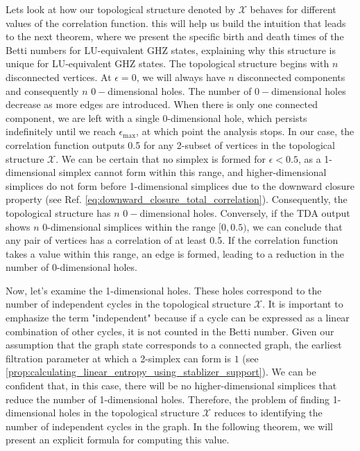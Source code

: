 \documentclass{article}
\begin{document}
 Lets look at how our topological structure denoted by $\mathcal{X} $ behaves for different values of the correlation function. this will help us build the intuition that leads to the next theorem, where we present the specific birth and death times of the Betti numbers for LU-equivalent GHZ states, explaining why this structure is unique for LU-equivalent GHZ states. The topological structure begins with $n$ disconnected vertices. At $\epsilon = 0$, we will always have $n$ disconnected components and consequently $n$ $0-$dimensional holes. The number of $0-$dimensional holes decrease as more edges are introduced. When there is only one connected component, we are left with a single 0-dimensional hole, which persists indefinitely until we reach $ \epsilon_{\text{max}} $, at which point the analysis stops. In our case, the correlation function outputs 0.5 for any 2-subset of vertices in the topological structure $ \mathcal{X} $. We can be certain that no simplex is formed for $ \epsilon < 0.5 $, as a 1-dimensional simplex cannot form within this range, and higher-dimensional simplices do not form before 1-dimensional simplices due to the downward closure property (see Ref. \ref{eq:downward_closure_total_correlation}). Consequently, the topological structure has $n$ $0-$dimensional holes. Conversely, if the TDA output shows $ n $ 0-dimensional simplices within the range $[0, 0.5)$, we can conclude that any pair of vertices has a correlation of at least 0.5. If the correlation function takes a value within this range, an edge is formed, leading to a reduction in the number of 0-dimensional holes.


Now, let's examine the 1-dimensional holes. These holes correspond to the number of independent cycles in the topological structure $ \mathcal{X} $. It is important to emphasize the term "independent" because if a cycle can be expressed as a linear combination of other cycles, it is not counted in the Betti number. Given our assumption that the graph state corresponds to a connected graph, the earliest filtration parameter at which a 2-simplex can form is $ 1 $ (see \ref{prop:calculating_linear_entropy_using_stablizer_support}). We can be confident that, in this case, there will be no higher-dimensional simplices that reduce the number of 1-dimensional holes. Therefore, the problem of finding 1-dimensional holes in the topological structure $ \mathcal{X} $ reduces to identifying the number of independent cycles in the graph. In the following theorem, we will present an explicit formula for computing this value.
\end{document}
